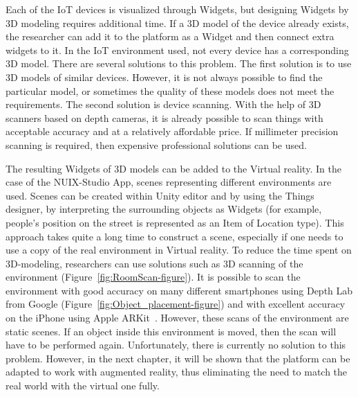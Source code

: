 Each of the IoT devices is visualized through Widgets, but designing Widgets by 3D modeling requires additional time. If a 3D model of the device already exists, the researcher can add it to the platform as a Widget and then connect extra widgets to it. In the IoT environment used, not every device has a corresponding 3D model. There are several solutions to this problem. The first solution is to use 3D models of similar devices. However, it is not always possible to find the particular model, or sometimes the quality of these models does not meet the requirements. The second solution is device scanning. With the help of 3D scanners based on depth cameras, it is already possible to scan things with acceptable accuracy and at a relatively affordable price. If millimeter precision scanning is required, then expensive professional solutions can be used.

The resulting Widgets of 3D models can be added to the Virtual reality. In the case of the NUIX-Studio App, scenes representing different environments are used. Scenes can be created within Unity editor and by using the Things designer, by interpreting the surrounding objects as Widgets (for example, people's position on the street is represented as an Item of Location type). This approach takes quite a long time to construct a scene, especially if one needs to use a copy of the real environment in Virtual reality. To reduce the time spent on 3D-modeling, researchers can use solutions such as 3D scanning of the environment (Figure~\ref{fig:RoomScan-figure}). It is possible to scan the environment with good accuracy on many different smartphones using Depth Lab from Google (Figure~\ref{fig:Object_placement-figure}) and with excellent accuracy on the iPhone using Apple ARKit~\cite{baek_two-dimensional_2020, breitbarth_measurement_2019}. However, these scans of the environment are static scenes. If an object inside this environment is moved, then the scan will have to be performed again. Unfortunately, there is currently no solution to this problem. However, in the next chapter, it will be shown that the platform can be adapted to work with augmented reality, thus eliminating the need to match the real world with the virtual one fully.


